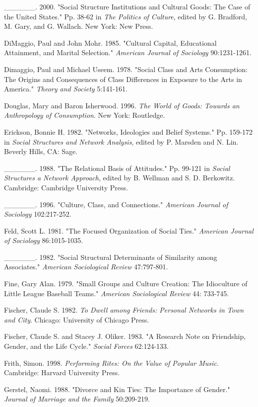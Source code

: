 \_\_\_\_\_\_. 2000. "Social Structure Institutions and Cultural Goods: The Case of the United States." Pp. 38-62 in \emph{The Politics of Culture}, edited by G. Bradford, M. Gary, and G. Wallach. New York: New Press.

DiMaggio, Paul and John Mohr. 1985. "Cultural Capital, Educational Attainment, and Marital Selection." \emph{American Journal of Sociology} 90:1231-1261.

Dimaggio, Paul and Michael Useem. 1978. "Social Class and Arts Consumption: The Origins and Consequences of Class Differences in Exposure to the Arts in America." \emph{Theory and Society} 5:141-161.

Douglas, Mary and Baron Isherwood. 1996. \emph{The World of Goods: Towards an Anthropology of Consumption}. New York: Routledge.

Erickson, Bonnie H. 1982. "Networks, Ideologies and Belief Systems." Pp. 159-172 in \emph{Social Structures and Network Analysis}, edited by P. Marsden and N. Lin. Beverly Hills, CA: Sage.

\_\_\_\_\_\_. 1988. "The Relational Basis of Attitudes." Pp. 99-121 in \emph{Social Structures a Network Approach}, edited by B. Wellman and S. D. Berkowitz. Cambridge: Cambridge University Press.

\_\_\_\_\_\_. 1996. "Culture, Class, and Connections." \emph{American Journal of Sociology} 102:217-252.

Feld, Scott L. 1981. "The Focused Organization of Social Ties." \emph{American Journal of Sociology} 86:1015-1035.

\_\_\_\_\_\_. 1982. "Social Structural Determinants of Similarity among Associates." \emph{American Sociological Review} 47:797-801.

Fine, Gary Alan. 1979. "Small Groups and Culture Creation: The Idioculture of Little League Baseball Teams." \emph{American Sociological Review} 44: 733-745.

Fischer, Claude S. 1982. \emph{To Dwell among Friends: Personal Networks in Town and City}. Chicago: University of Chicago Press.

Fischer, Claude S. and Stacey J. Oliker. 1983. "A Research Note on Friendship, Gender, and the Life Cycle." \emph{Social Forces} 62:124-133.

Frith, Simon. 1998. \emph{Performing Rites: On the Value of Popular Music}. Cambridge: Harvard University Press.

Gerstel, Naomi. 1988. "Divorce and Kin Ties: The Importance of Gender." \emph{Journal of Marriage and the Family} 50:209-219.

